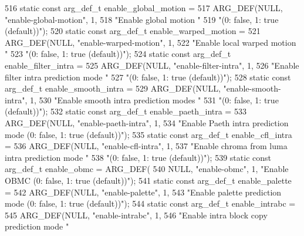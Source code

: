 \begin{DoxyCodeInclude}
{{{{{{{516 \textcolor{keyword}{static} \textcolor{keyword}{const} arg\_def\_t enable\_global\_motion =
517     ARG\_DEF(NULL, \textcolor{stringliteral}{"enable-global-motion"}, 1,
518             \textcolor{stringliteral}{"Enable global motion "}
519             \textcolor{stringliteral}{"(0: false, 1: true (default))"});
520 \textcolor{keyword}{static} \textcolor{keyword}{const} arg\_def\_t enable\_warped\_motion =
521     ARG\_DEF(NULL, \textcolor{stringliteral}{"enable-warped-motion"}, 1,
522             \textcolor{stringliteral}{"Enable local warped motion "}
523             \textcolor{stringliteral}{"(0: false, 1: true (default))"});
524 \textcolor{keyword}{static} \textcolor{keyword}{const} arg\_def\_t enable\_filter\_intra =
525     ARG\_DEF(NULL, \textcolor{stringliteral}{"enable-filter-intra"}, 1,
526             \textcolor{stringliteral}{"Enable filter intra prediction mode "}
527             \textcolor{stringliteral}{"(0: false, 1: true (default))"});
528 \textcolor{keyword}{static} \textcolor{keyword}{const} arg\_def\_t enable\_smooth\_intra =
529     ARG\_DEF(NULL, \textcolor{stringliteral}{"enable-smooth-intra"}, 1,
530             \textcolor{stringliteral}{"Enable smooth intra prediction modes "}
531             \textcolor{stringliteral}{"(0: false, 1: true (default))"});
532 \textcolor{keyword}{static} \textcolor{keyword}{const} arg\_def\_t enable\_paeth\_intra =
533     ARG\_DEF(NULL, \textcolor{stringliteral}{"enable-paeth-intra"}, 1,
534             \textcolor{stringliteral}{"Enable Paeth intra prediction mode (0: false, 1: true (default))"});
535 \textcolor{keyword}{static} \textcolor{keyword}{const} arg\_def\_t enable\_cfl\_intra =
536     ARG\_DEF(NULL, \textcolor{stringliteral}{"enable-cfl-intra"}, 1,
537             \textcolor{stringliteral}{"Enable chroma from luma intra prediction mode "}
538             \textcolor{stringliteral}{"(0: false, 1: true (default))"});
539 \textcolor{keyword}{static} \textcolor{keyword}{const} arg\_def\_t enable\_obmc = ARG\_DEF(
540     NULL, \textcolor{stringliteral}{"enable-obmc"}, 1, \textcolor{stringliteral}{"Enable OBMC (0: false, 1: true (default))"});
541 \textcolor{keyword}{static} \textcolor{keyword}{const} arg\_def\_t enable\_palette =
542     ARG\_DEF(NULL, \textcolor{stringliteral}{"enable-palette"}, 1,
543             \textcolor{stringliteral}{"Enable palette prediction mode (0: false, 1: true (default))"});
544 \textcolor{keyword}{static} \textcolor{keyword}{const} arg\_def\_t enable\_intrabc =
545     ARG\_DEF(NULL, \textcolor{stringliteral}{"enable-intrabc"}, 1,
546             \textcolor{stringliteral}{"Enable intra block copy prediction mode "}
}}}}}}}
\end{DoxyCodeInclude}
